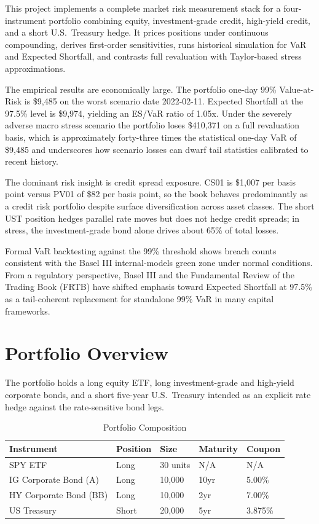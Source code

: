 \documentclass[11pt, a4paper]{article}
\begin{document}
This project implements a complete market risk measurement stack for a four-instrument portfolio combining equity, investment-grade credit, high-yield credit, and a short U.S.\ Treasury hedge. It prices positions under continuous compounding, derives first-order sensitivities, runs historical simulation for VaR and Expected Shortfall, and contrasts full revaluation with Taylor-based stress approximations.

The empirical results are economically large. The portfolio one-day 99\% Value-at-Risk is \$9,485 on the worst scenario date 2022-02-11. Expected Shortfall at the 97.5\% level is \$9,974, yielding an ES/VaR ratio of 1.05x. Under the severely adverse macro stress scenario the portfolio loses \$410,371 on a full revaluation basis, which is approximately forty-three times the statistical one-day VaR of \$9,485 and underscores how scenario losses can dwarf tail statistics calibrated to recent history.

The dominant risk insight is credit spread exposure. CS01 is \$1,007 per basis point versus PV01 of \$82 per basis point, so the book behaves predominantly as a credit risk portfolio despite surface diversification across asset classes. The short UST position hedges parallel rate moves but does not hedge credit spreads; in stress, the investment-grade bond alone drives about 65\% of total losses.

Formal VaR backtesting against the 99\% threshold shows breach counts consistent with the Basel III internal-models green zone under normal conditions. From a regulatory perspective, Basel III and the Fundamental Review of the Trading Book (FRTB) have shifted emphasis toward Expected Shortfall at 97.5\% as a tail-coherent replacement for standalone 99\% VaR in many capital frameworks.

\section{Portfolio Overview}

The portfolio holds a long equity ETF, long investment-grade and high-yield corporate bonds, and a short five-year U.S.\ Treasury intended as an explicit rate hedge against the rate-sensitive bond legs.

\begin{table}[H]
\centering
\caption{Portfolio Composition}
\begin{tabularx}{\textwidth}{lXXXX}
\toprule
\textbf{Instrument} & \textbf{Position} & 
\textbf{Size} & \textbf{Maturity} & 
\textbf{Coupon} \\
\midrule
SPY ETF & Long & 30 units & N/A & N/A \\
IG Corporate Bond (A) & Long & 10,000 & 
10yr & 5.00\% \\
HY Corporate Bond (BB) & Long & 10,000 & 
2yr & 7.00\% \\
US Treasury & Short & 20,000 & 5yr & 
3.875\% \\
\bottomrule
\end{tabularx}
\end{table}
\end{document}

